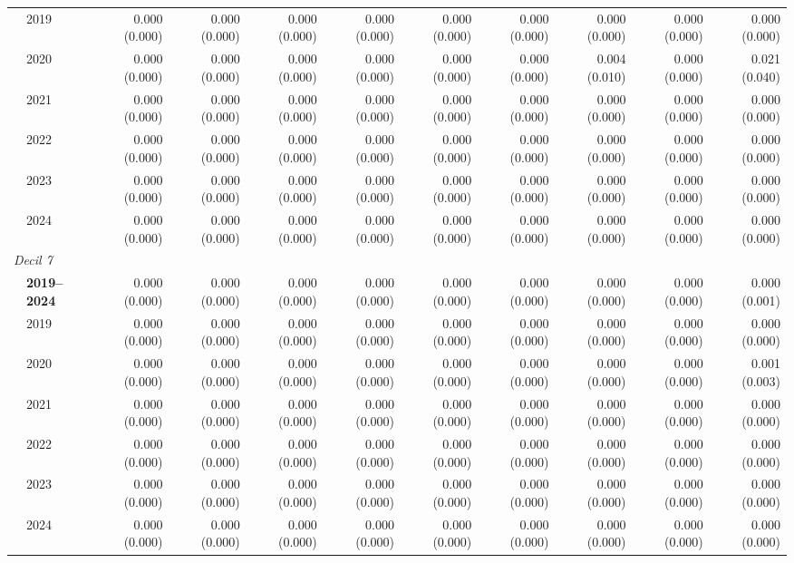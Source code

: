 \begin{table}[htbp]
\begin{tabular}{llrrrrrrrrr}
 & 2019 & 0.000 (0.000) & 0.000 (0.000) & 0.000 (0.000) & 0.000 (0.000) & 0.000 (0.000) & 0.000 (0.000) & 0.000 (0.000) & 0.000 (0.000) & 0.000 (0.000) \\
 & 2020 & 0.000 (0.000) & 0.000 (0.000) & 0.000 (0.000) & 0.000 (0.000) & 0.000 (0.000) & 0.000 (0.000) & 0.004 (0.010) & 0.000 (0.000) & 0.021 (0.040) \\
 & 2021 & 0.000 (0.000) & 0.000 (0.000) & 0.000 (0.000) & 0.000 (0.000) & 0.000 (0.000) & 0.000 (0.000) & 0.000 (0.000) & 0.000 (0.000) & 0.000 (0.000) \\
 & 2022 & 0.000 (0.000) & 0.000 (0.000) & 0.000 (0.000) & 0.000 (0.000) & 0.000 (0.000) & 0.000 (0.000) & 0.000 (0.000) & 0.000 (0.000) & 0.000 (0.000) \\
 & 2023 & 0.000 (0.000) & 0.000 (0.000) & 0.000 (0.000) & 0.000 (0.000) & 0.000 (0.000) & 0.000 (0.000) & 0.000 (0.000) & 0.000 (0.000) & 0.000 (0.000) \\
 & 2024 & 0.000 (0.000) & 0.000 (0.000) & 0.000 (0.000) & 0.000 (0.000) & 0.000 (0.000) & 0.000 (0.000) & 0.000 (0.000) & 0.000 (0.000) & 0.000 (0.000) \\
\midrule
\multicolumn{11}{l}{\textit{Decil 7}} \\
 & \textbf{2019–2024} & 0.000 (0.000) & 0.000 (0.000) & 0.000 (0.000) & 0.000 (0.000) & 0.000 (0.000) & 0.000 (0.000) & 0.000 (0.000) & 0.000 (0.000) & 0.000 (0.001) \\
 & 2019 & 0.000 (0.000) & 0.000 (0.000) & 0.000 (0.000) & 0.000 (0.000) & 0.000 (0.000) & 0.000 (0.000) & 0.000 (0.000) & 0.000 (0.000) & 0.000 (0.000) \\
 & 2020 & 0.000 (0.000) & 0.000 (0.000) & 0.000 (0.000) & 0.000 (0.000) & 0.000 (0.000) & 0.000 (0.000) & 0.000 (0.000) & 0.000 (0.000) & 0.001 (0.003) \\
 & 2021 & 0.000 (0.000) & 0.000 (0.000) & 0.000 (0.000) & 0.000 (0.000) & 0.000 (0.000) & 0.000 (0.000) & 0.000 (0.000) & 0.000 (0.000) & 0.000 (0.000) \\
 & 2022 & 0.000 (0.000) & 0.000 (0.000) & 0.000 (0.000) & 0.000 (0.000) & 0.000 (0.000) & 0.000 (0.000) & 0.000 (0.000) & 0.000 (0.000) & 0.000 (0.000) \\
 & 2023 & 0.000 (0.000) & 0.000 (0.000) & 0.000 (0.000) & 0.000 (0.000) & 0.000 (0.000) & 0.000 (0.000) & 0.000 (0.000) & 0.000 (0.000) & 0.000 (0.000) \\
 & 2024 & 0.000 (0.000) & 0.000 (0.000) & 0.000 (0.000) & 0.000 (0.000) & 0.000 (0.000) & 0.000 (0.000) & 0.000 (0.000) & 0.000 (0.000) & 0.000 (0.000) \\

\end{tabular}
\end{table}
